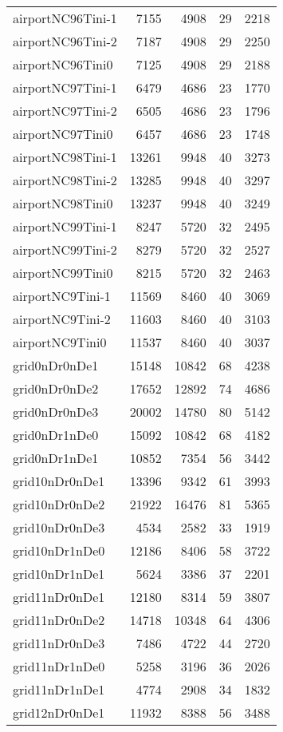 \begin{longtable}{lrrrr}
airportNC96Tini-1 & 7155 & 4908 & 29 & 2218 \\
airportNC96Tini-2 & 7187 & 4908 & 29 & 2250 \\
airportNC96Tini0 & 7125 & 4908 & 29 & 2188 \\
airportNC97Tini-1 & 6479 & 4686 & 23 & 1770 \\
airportNC97Tini-2 & 6505 & 4686 & 23 & 1796 \\
airportNC97Tini0 & 6457 & 4686 & 23 & 1748 \\
airportNC98Tini-1 & 13261 & 9948 & 40 & 3273 \\
airportNC98Tini-2 & 13285 & 9948 & 40 & 3297 \\
airportNC98Tini0 & 13237 & 9948 & 40 & 3249 \\
airportNC99Tini-1 & 8247 & 5720 & 32 & 2495 \\
airportNC99Tini-2 & 8279 & 5720 & 32 & 2527 \\
airportNC99Tini0 & 8215 & 5720 & 32 & 2463 \\
airportNC9Tini-1 & 11569 & 8460 & 40 & 3069 \\
airportNC9Tini-2 & 11603 & 8460 & 40 & 3103 \\
airportNC9Tini0 & 11537 & 8460 & 40 & 3037 \\
grid0nDr0nDe1 & 15148 & 10842 & 68 & 4238 \\
grid0nDr0nDe2 & 17652 & 12892 & 74 & 4686 \\
grid0nDr0nDe3 & 20002 & 14780 & 80 & 5142 \\
grid0nDr1nDe0 & 15092 & 10842 & 68 & 4182 \\
grid0nDr1nDe1 & 10852 & 7354 & 56 & 3442 \\
grid10nDr0nDe1 & 13396 & 9342 & 61 & 3993 \\
grid10nDr0nDe2 & 21922 & 16476 & 81 & 5365 \\
grid10nDr0nDe3 & 4534 & 2582 & 33 & 1919 \\
grid10nDr1nDe0 & 12186 & 8406 & 58 & 3722 \\
grid10nDr1nDe1 & 5624 & 3386 & 37 & 2201 \\
grid11nDr0nDe1 & 12180 & 8314 & 59 & 3807 \\
grid11nDr0nDe2 & 14718 & 10348 & 64 & 4306 \\
grid11nDr0nDe3 & 7486 & 4722 & 44 & 2720 \\
grid11nDr1nDe0 & 5258 & 3196 & 36 & 2026 \\
grid11nDr1nDe1 & 4774 & 2908 & 34 & 1832 \\
grid12nDr0nDe1 & 11932 & 8388 & 56 & 3488 \\

\end{longtable}
